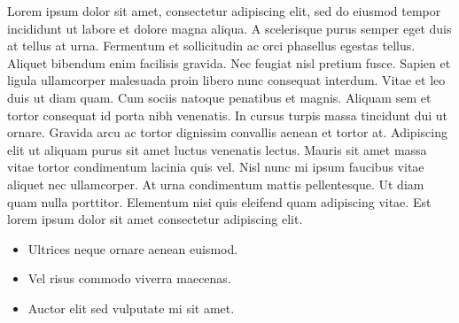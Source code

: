 \begin{PosterColumn}{0.23}

%
\begin{TextBox}
 \vspace*{0.9cm}
 
 \sf \LARGE
 
 Lorem ipsum dolor sit amet, consectetur adipiscing elit, sed do eiusmod tempor incididunt ut labore et dolore magna aliqua. A scelerisque purus semper eget duis at tellus at urna. Fermentum et sollicitudin ac orci phasellus egestas tellus. Aliquet bibendum enim facilisis gravida. Nec feugiat nisl pretium fusce. Sapien et ligula ullamcorper malesuada proin libero nunc consequat interdum. Vitae et leo duis ut diam quam. Cum sociis natoque penatibus et magnis. Aliquam sem et tortor consequat id porta nibh venenatis. In cursus turpis massa tincidunt dui ut ornare. Gravida arcu ac tortor dignissim convallis aenean et tortor at. Adipiscing elit ut aliquam purus sit amet luctus venenatis lectus. Mauris sit amet massa vitae tortor condimentum lacinia quis vel. Nisl nunc mi ipsum faucibus vitae aliquet nec ullamcorper. At urna condimentum mattis pellentesque. Ut diam quam nulla porttitor. Elementum nisi quis eleifend quam adipiscing vitae. Est lorem ipsum dolor sit amet consectetur adipiscing elit. 
 
 \end{TextBox}



\begin{TextBox}
 \vspace*{0.9cm}

 \sf \LARGE

\begin{itemize}
\item Ultrices neque ornare aenean euismod. 
\item Vel risus commodo viverra maecenas. 
\item Auctor elit sed vulputate mi sit amet. 

\end{itemize}
	

\end{TextBox}

\end{PosterColumn}
